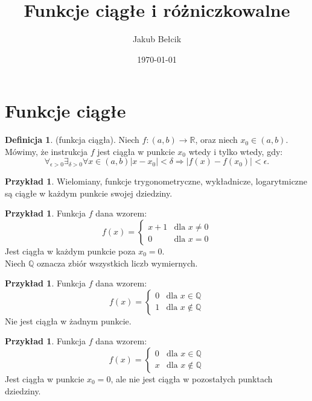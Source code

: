 \documentclass[12pt,a4paper]{article}
\title{Funkcje ciągłe i różniczkowalne}
\date{\today}
\author{Jakub Bełcik}
\theoremstyle{definition}
\newtheorem{df}[tw]{Definicja}
\newtheorem{ex}[tw]{Przykład}
\begin{document}
\maketitle

\tableofcontents

\section{Funkcje ciągłe}

\begin{df}
(funkcja ciągła). Niech $f: (a,b) \rightarrow \mathbb{R}$, oraz niech $x_0 \in (a,b)$. Mówimy, że instrukcja $f$ jest ciągła w punkcie $x_0$ wtedy i tylko wtedy, gdy:
\[ \forall_{\epsilon >0}\exists_{\delta >0}\forall x \in (a,b) |x-x_0| < \delta  \Rightarrow  |f(x) - f(x_0)| < \epsilon .\]
\end{df}

\begin{ex}
Wielomiany, funkcje trygonometryczne, wykładnicze, logarytmiczne są ciągłe w każdym punkcie swojej dziedziny.
\end{ex}

\begin{ex}
Funkcja $f$ dana wzorem:
\[ f (x) = \left\{ \begin{array}{ll} x + 1 & \mbox{dla } x \neq  0 \\ 0 & \mbox{dla } x = 0 \end{array} \right. \]
Jest ciągła w każdym punkcie poza $x_0 = 0$.
\\ Niech $\mathbb{Q}$ oznacza zbiór wszystkich liczb wymiernych.
\end{ex}

\begin{ex}
Funkcja $f$ dana wzorem:
\[ f (x) = \left\{ \begin{array}{ll} 0 & \mbox{dla } x \in  \mathbb{Q} \\ 1 & \mbox{dla } x \notin  \mathbb{Q} \end{array} \right. \]
Nie jest ciągła w żadnym punkcie.
\end{ex}

\newpage

\begin{ex}
Funkcja $f$ dana wzorem:
\[ f (x) = \left\{ \begin{array}{ll} 0 & \mbox{dla } x \in  \mathbb{Q} \\ x & \mbox{dla } x \notin  \mathbb{Q} \end{array} \right. \]
Jest ciągła w punkcie $x_0 = 0$, ale nie jest ciągła w pozostałych punktach dziedziny.
\end{ex}
\end{document}
